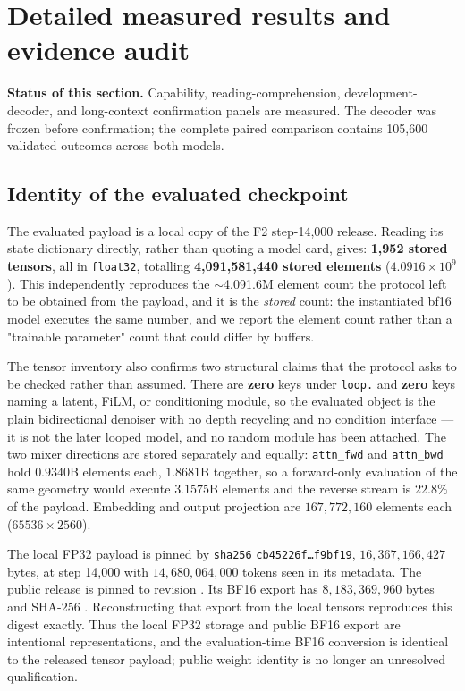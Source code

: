 \section{Detailed measured results and evidence audit}
\label{m:results}

\textbf{Status of this section.} Capability, reading-comprehension, development-decoder, and long-context confirmation panels are measured. The decoder was frozen before confirmation; the complete paired comparison contains 105,600 validated outcomes across both models.

\subsection{Identity of the evaluated checkpoint}
\label{m:identity}

The evaluated payload is a local copy of the F2 step-14,000 release. Reading its state
dictionary directly, rather than quoting a model card, gives: \textbf{1{,}952 stored
tensors}, all in \texttt{float32}, totalling \textbf{4{,}091{,}581{,}440 stored
elements} ($4.0916\times10^9$). This independently reproduces the $\sim$4{,}091.6M element
count the protocol left to be obtained from the payload, and it is the \emph{stored} count:
the instantiated bf16 model executes the same number, and we report the element count
rather than a "trainable parameter" count that could differ by buffers.

The tensor inventory also confirms two structural claims that the protocol asks to be
checked rather than assumed. There are \textbf{zero} keys under \texttt{loop.} and
\textbf{zero} keys naming a latent, FiLM, or conditioning module, so the evaluated object
is the plain bidirectional denoiser with no depth recycling and no condition interface ---
it is not the later looped model, and no random module has been attached. The two mixer
directions are stored separately and equally: \texttt{attn\_fwd} and \texttt{attn\_bwd}
hold $0.9340$B elements each, $1.8681$B together, so a forward-only evaluation of the same
geometry would execute $3.1575$B elements and the reverse stream is $22.8\%$ of the
payload. Embedding and output projection are $167{,}772{,}160$ elements each
($65536\times2560$).

The local FP32 payload is pinned by \texttt{sha256}
\texttt{cb45226f\ldots f9bf19}, $16{,}367{,}166{,}427$ bytes, at step 14{,}000 with
$14{,}680{,}064{,}000$ tokens seen in its metadata. The public release is pinned to
revision . Its BF16 export has
$8{,}183{,}369{,}960$ bytes and SHA-256
.
Reconstructing that export from the local tensors reproduces this digest exactly.
Thus the local FP32 storage and public BF16 export are intentional representations,
and the evaluation-time BF16 conversion is identical to the released tensor payload;
public weight identity is no longer an unresolved qualification.

